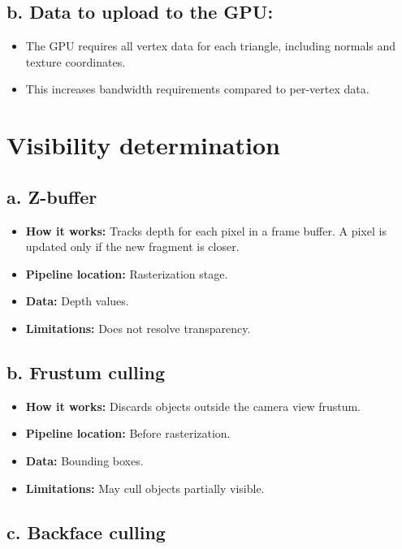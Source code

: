 \documentclass{article}
\begin{document}
\subsection{b. Data to upload to the GPU:}
\begin{itemize}
    \item The GPU requires all vertex data for each triangle, including normals and texture coordinates.
    \item This increases bandwidth requirements compared to per-vertex data.
\end{itemize}

\newpage
\section{Visibility determination}

\subsection{a. Z-buffer}

\begin{itemize}
    \item \textbf{How it works:} Tracks depth for each pixel in a frame buffer. A pixel is updated only if the new fragment is closer.
    \item \textbf{Pipeline location:} Rasterization stage.
    \item \textbf{Data:} Depth values.
    \item \textbf{Limitations:} Does not resolve transparency.
\end{itemize}

\subsection{b. Frustum culling}

\begin{itemize}
    \item \textbf{How it works:} Discards objects outside the camera view frustum.
    \item \textbf{Pipeline location:} Before rasterization.
    \item \textbf{Data:} Bounding boxes.
    \item \textbf{Limitations:} May cull objects partially visible.
\end{itemize}

\subsection{c. Backface culling}
\end{document}
